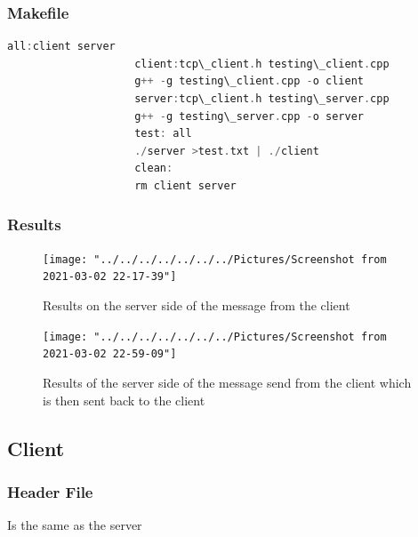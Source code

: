 \documentclass[11pt]{article}
\begin{document}
			\subsubsection{Makefile}
				\begin{lstlisting}[language=C++]
					all:client server
					client:tcp\_client.h testing\_client.cpp
					g++ -g testing\_client.cpp -o client
					server:tcp\_client.h testing\_server.cpp
					g++ -g testing\_server.cpp -o server
					test: all
					./server >test.txt | ./client
					clean:
					rm client server
				\end{lstlisting}
			\subsubsection{Results}
				\begin{figure}[H]
					\centering
					\texttt{[image: "../../../../../../../Pictures/Screenshot from 2021-03-02 22-17-39"]}
					\caption{Results on the server side of the message from the client}
					\label{fig:screenshot-from-2021-03-02-22-17-39}
				\end{figure}
				\begin{figure}[H]
					\centering
					\texttt{[image: "../../../../../../../Pictures/Screenshot from 2021-03-02 22-59-09"]}
					\caption{Results of the server side of the message send from the client which is then sent back to the client }
					\label{fig:screenshot-from-2021-03-02-22-59-09}
				\end{figure}	
		\subsection{Client}
			\subsubsection{Header File}
				Is the same as the server
\end{document}
